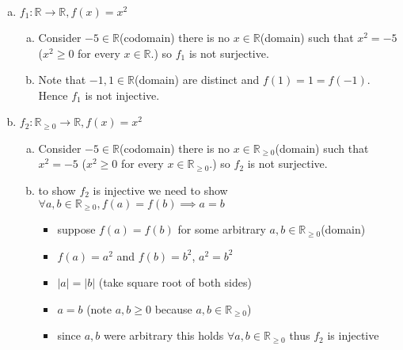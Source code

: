 \documentclass[12pt]{article}
\begin{document}
\begin{enumerate}[a)]
    \item $f_{1} : \mathbb{R} \rightarrow \mathbb{R} , f(x) =x ^2$
    \begin{enumerate}[a)]
        \item Consider $-5\in\mathbb{R}$(codomain) there is no $x\in\mathbb{R}$(domain) such that $x^2 = -5$  ($x^2 \geq 0$ for every $x\in\mathbb{R}$.) so $f_{1}$ is not surjective.
        \item Note that $-1,1\in\mathbb{R}$(domain) are distinct and $f(1) = 1 = f(-1)$. Hence $f_{1}$ is not injective.
    \end{enumerate}
    
    \item $f_{2} : \mathbb{R}_{\geq 0} \rightarrow \mathbb{R} , f(x) =x ^2$
    \begin{enumerate}[a)]
        \item Consider $-5\in\mathbb{R}$(codomain) there is no $x\in\mathbb{R}_{\geq 0}$(domain) such that $x^2 = -5$  ($x^2 \geq 0$ for every $x\in\mathbb{R}_{\geq 0}$.) so $f_{2}$ is not surjective.
        \item to show $f_{2}$ is injective we need to show $\forall a,b \in\mathbb{R}_{\geq 0} , f(a) = f(b) \implies a=b$
        \begin{itemize}
            \item suppose $f(a) = f(b)$ for some arbitrary $a,b \in \mathbb{R}_{\geq 0} $(domain)
            \item $f(a) = a^2 $ and $f(b) = b^2 $, $a^2 = b^2$
            \item $|a| = |b|$  (take square root of both sides)
            \item $a=b$ (note $a,b \geq 0$ because $a,b \in \mathbb{R}_{\geq 0}$)
            \item since $a,b$ were arbitrary this holds $\forall a,b \in \mathbb{R}_{\geq 0}$ thus $f_{2}$ is injective
        \end{itemize} 
    \end{enumerate}
    

\end{enumerate}
\end{document}
